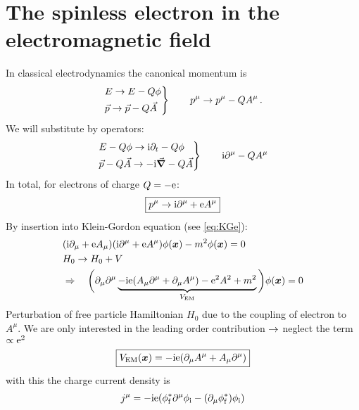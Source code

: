 \section{The spinless electron in the electromagnetic field}
In classical electrodynamics the canonical momentum is
\begin{align}
    \begin{rcases} E \rightarrow E - Q \phi \\ \vec p \rightarrow \vec p - Q \vec A \end{rcases} \qquad p^\mu \rightarrow p^\mu - Q A^\mu\,.
\end{align}
We will substitute by operators:
\begin{align}
    \begin{rcases} E - Q \phi \rightarrow \mathrm{i} \partial_t - Q \phi \\ \vec p - Q \vec A \rightarrow - \mathrm{i} \vec \grad - Q \vec A \end{rcases} \qquad \mathrm{i} \partial^\mu - Q A^\mu
\end{align}
In total, for electrons of charge $Q= -\mathrm{e}$:
\begin{align}
    \boxed{p^\mu \rightarrow \mathrm{i} \partial^\mu + \mathrm{e} A^\mu}
\end{align}
By insertion into Klein-Gordon equation (see \cref{eq:KGe}):
\begin{align}\begin{split}
    & \qty(\mathrm{i} \partial_\mu + \mathrm{e} A_\mu) \qty(\mathrm{i} \partial^\mu + \mathrm{e} A^\mu) \phi\qty({\bm{x}}) - m^2 \phi \qty({\bm{x}}) = 0 \\
    & H_0 \rightarrow H_0 + V \\
    & \Rightarrow \quad \bigg( \partial_\mu\partial^\mu \underbrace{- \mathrm{i} \mathrm{e} \qty(A_\mu \partial^\mu + \partial_\mu A^\mu ) - \mathrm{e}^2 A^2 + m^2}_{V_{\mathrm{EM}}} \bigg) \phi \qty({\bm{x}}) = 0
\end{split}\end{align}
Perturbation of free particle Hamiltonian $H_0$ due to the coupling of electron to $A^\mu$. We are only interested in the leading order contribution $\rightarrow$ neglect the term $\propto \mathrm{e}^2$
\begin{align}
    \boxed{ V_{\mathrm{EM}} \qty({\bm{x}}) = - \mathrm{i} \mathrm{e} \qty(\partial_\mu A^\mu + A_\mu \partial^\mu) }
\end{align}
with this the charge current density is
\begin{align}
    j^\mu = - \mathrm{i} \mathrm{e} \qty( \phi_{\mathrm{f}}^* \partial^\mu \phi_{\mathrm{i}} - \qty( \partial_\mu \phi_{\mathrm{f}}^*) \phi_{\mathrm{i}} )
\end{align}
